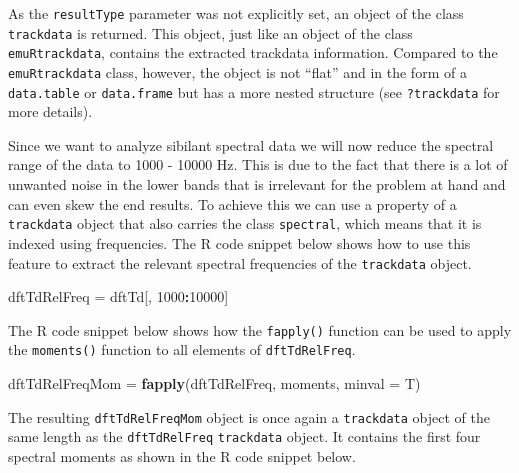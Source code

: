 \documentclass[]{book}
\newenvironment{Shaded}{\begin{snugshade}}{\end{snugshade}}
\newcommand{\CommentTok}[1]{\textcolor[rgb]{0.56,0.35,0.01}{\textit{#1}}}
\newcommand{\DataTypeTok}[1]{\textcolor[rgb]{0.13,0.29,0.53}{#1}}
\newcommand{\DecValTok}[1]{\textcolor[rgb]{0.00,0.00,0.81}{#1}}
\newcommand{\KeywordTok}[1]{\textcolor[rgb]{0.13,0.29,0.53}{\textbf{#1}}}
\newcommand{\NormalTok}[1]{#1}
\newcommand{\OperatorTok}[1]{\textcolor[rgb]{0.81,0.36,0.00}{\textbf{#1}}}
\newcommand{\StringTok}[1]{\textcolor[rgb]{0.31,0.60,0.02}{#1}}
\begin{document}
As the \texttt{resultType} parameter was not explicitly set, an object of the class \texttt{trackdata} is returned. This object, just like an object of the class \texttt{emuRtrackdata}, contains the extracted trackdata information. Compared to the \texttt{emuRtrackdata} class, however, the object is not ``flat'' and in the form of a \texttt{data.table} or \texttt{data.frame} but has a more nested structure (see \texttt{?trackdata} for more details).

Since we want to analyze sibilant spectral data we will now reduce the spectral range of the data to 1000 - 10000 Hz. This is due to the fact that there is a lot of unwanted noise in the lower bands that is irrelevant for the problem at hand and can even skew the end results. To achieve this we can use a property of a \texttt{trackdata} object that also carries the class \texttt{spectral}, which means that it is indexed using frequencies. The R code snippet below shows how to use this feature to extract the relevant spectral frequencies of the \texttt{trackdata} object.

\begin{Shaded}
\begin{Highlighting}[]
\NormalTok{dftTdRelFreq =}\StringTok{ }\NormalTok{dftTd[, }\DecValTok{1000}\OperatorTok{:}\DecValTok{10000}\NormalTok{]}
\end{Highlighting}
\end{Shaded}

The R code snippet below shows how the \texttt{fapply()} function can be used to apply the \texttt{moments()} function to all elements of \texttt{dftTdRelFreq}.

\begin{Shaded}
\begin{Highlighting}[]
\NormalTok{dftTdRelFreqMom =}\StringTok{ }\KeywordTok{fapply}\NormalTok{(dftTdRelFreq, moments, }\DataTypeTok{minval =}\NormalTok{ T)}
\end{Highlighting}
\end{Shaded}

The resulting \texttt{dftTdRelFreqMom} object is once again a \texttt{trackdata} object of the same length as the \texttt{dftTdRelFreq} \texttt{trackdata} object. It contains the first four spectral moments as shown in the R code snippet below.

\begin{Shaded}
\end{Shaded}
\end{document}
